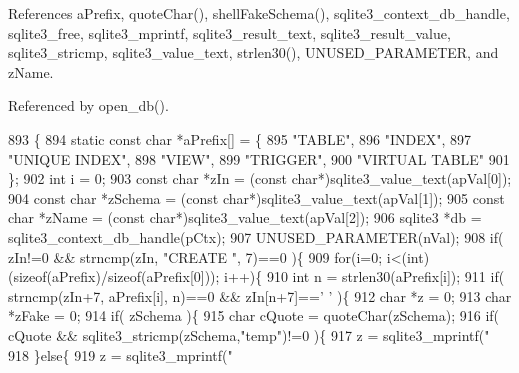 References a\+Prefix, quote\+Char(), shell\+Fake\+Schema(), sqlite3\+\_\+context\+\_\+db\+\_\+handle, sqlite3\+\_\+free, sqlite3\+\_\+mprintf, sqlite3\+\_\+result\+\_\+text, sqlite3\+\_\+result\+\_\+value, sqlite3\+\_\+stricmp, sqlite3\+\_\+value\+\_\+text, strlen30(), U\+N\+U\+S\+E\+D\+\_\+\+P\+A\+R\+A\+M\+E\+T\+ER, and z\+Name.



Referenced by open\+\_\+db().


\begin{DoxyCode}
893  \{
894   \textcolor{keyword}{static} \textcolor{keyword}{const} \textcolor{keywordtype}{char} *aPrefix[] = \{
895      \textcolor{stringliteral}{"TABLE"},
896      \textcolor{stringliteral}{"INDEX"},
897      \textcolor{stringliteral}{"UNIQUE INDEX"},
898      \textcolor{stringliteral}{"VIEW"},
899      \textcolor{stringliteral}{"TRIGGER"},
900      \textcolor{stringliteral}{"VIRTUAL TABLE"}
901   \};
902   \textcolor{keywordtype}{int} i = 0;
903   \textcolor{keyword}{const} \textcolor{keywordtype}{char} *zIn = (\textcolor{keyword}{const} \textcolor{keywordtype}{char}*)sqlite3_value_text(apVal[0]);
904   \textcolor{keyword}{const} \textcolor{keywordtype}{char} *zSchema = (\textcolor{keyword}{const} \textcolor{keywordtype}{char}*)sqlite3_value_text(apVal[1]);
905   \textcolor{keyword}{const} \textcolor{keywordtype}{char} *zName = (\textcolor{keyword}{const} \textcolor{keywordtype}{char}*)sqlite3_value_text(apVal[2]);
906   sqlite3 *db = sqlite3_context_db_handle(pCtx);
907   UNUSED_PARAMETER(nVal);
908   \textcolor{keywordflow}{if}( zIn!=0 && strncmp(zIn, \textcolor{stringliteral}{"CREATE "}, 7)==0 )\{
909     \textcolor{keywordflow}{for}(i=0; i<(int)(\textcolor{keyword}{sizeof}(aPrefix)/\textcolor{keyword}{sizeof}(aPrefix[0])); i++)\{
910       \textcolor{keywordtype}{int} n = strlen30(aPrefix[i]);
911       \textcolor{keywordflow}{if}( strncmp(zIn+7, aPrefix[i], n)==0 && zIn[n+7]==\textcolor{charliteral}{' '} )\{
912         \textcolor{keywordtype}{char} *z = 0;
913         \textcolor{keywordtype}{char} *zFake = 0;
914         \textcolor{keywordflow}{if}( zSchema )\{
915           \textcolor{keywordtype}{char} cQuote = quoteChar(zSchema);
916           \textcolor{keywordflow}{if}( cQuote && sqlite3_stricmp(zSchema,\textcolor{stringliteral}{"temp"})!=0 )\{
917             z = sqlite3_mprintf(\textcolor{stringliteral}{"%
918           \}\textcolor{keywordflow}{else}\{
919             z = sqlite3_mprintf(\textcolor{stringliteral}{"%
}}
\end{DoxyCode}
